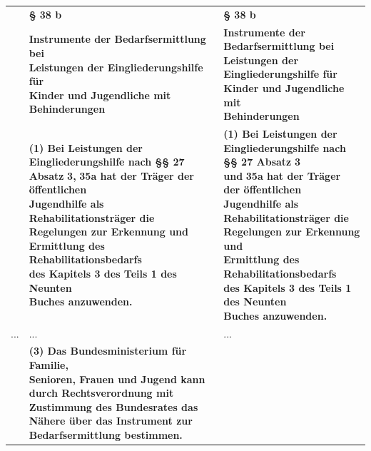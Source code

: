 \documentclass[10pt,a4paper,landscape]{article}
\begin{document}
\begin{longtable}{|L{8.2cm}|L{8.2cm}|L{8.2cm}|}
\hhline{|---|}
 & \textbf{\S{} 38 b } & \textbf{\S{} 38 b } \\
\hhline{|---|}
 & \textbf{Instrumente der Bedarfsermittlung bei  \newline Leistungen der Eingliederungshilfe für  \newline Kinder und Jugendliche mit  \newline Behinderungen } & \textbf{Instrumente der Bedarfsermittlung bei  \newline Leistungen der Eingliederungshilfe für  \newline Kinder und Jugendliche mit  \newline Behinderungen } \\
\hhline{|---|}
 & \textbf{(1) Bei Leistungen der  \newline Eingliederungshilfe nach \S{}\S{} 27 Absatz} \newline \textbf{\textcolor{diffred}{3,}}\textbf{ 35a hat der Träger der öffentlichen  \newline Jugendhilfe als Rehabilitationsträger die  \newline Regelungen zur Erkennung und  \newline Ermittlung des Rehabilitationsbedarfs  \newline des Kapitels 3 des Teils 1 des Neunten  \newline Buches anzuwenden. } & \textbf{(1) Bei Leistungen der  \newline Eingliederungshilfe nach \S{}\S{} 27 Absatz }\textbf{\textcolor{diffgreen}{3  \newline und}}\textbf{ 35a hat der Träger der öffentlichen  \newline Jugendhilfe als Rehabilitationsträger die  \newline Regelungen zur Erkennung und  \newline Ermittlung des Rehabilitationsbedarfs  \newline des Kapitels 3 des Teils 1 des Neunten  \newline Buches anzuwenden. } \\
\hhline{|---|}
... & ... & ... \\
\hhline{|---|}
 & \textbf{\textcolor{diffred}{(3) Das Bundesministerium für Familie,  \newline Senioren, Frauen und Jugend kann  \newline durch Rechtsverordnung mit  \newline Zustimmung des Bundesrates das  \newline Nähere über das Instrument zur  \newline Bedarfsermittlung bestimmen. }} &  \\

\end{longtable}
\end{document}
